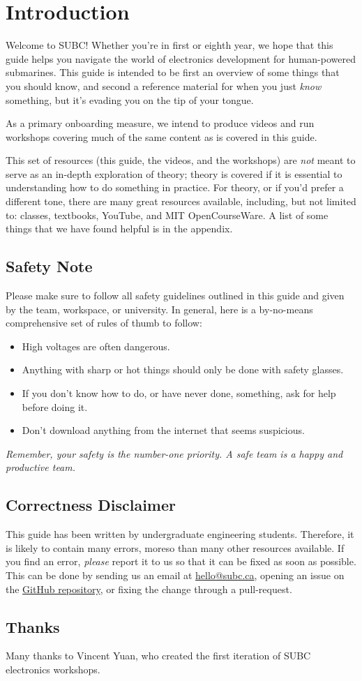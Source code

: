\chapter{Introduction}
Welcome to SUBC! Whether you're in first or eighth year, we hope that this guide helps you navigate the world of electronics development for human-powered submarines. This guide is intended to be first an overview of some things that you should know, and second a reference material for when you just \emph{know} something, but it's evading you on the tip of your tongue.

As a primary onboarding measure, we intend to produce videos and run workshops covering much of the same content as is covered in this guide.

This set of resources (this guide, the videos, and the workshops) are \emph{not} meant to serve as an in-depth exploration of theory; theory is covered if it is essential to understanding how to do something in practice. For theory, or if you'd prefer a different tone, there are many great resources available, including, but not limited to: classes, textbooks, YouTube, and MIT OpenCourseWare. A list of some things that we have found helpful is in the appendix.

\section{Safety Note}
Please make sure to follow all safety guidelines outlined in this guide and given by the team, workspace, or university. In general, here is a by-no-means comprehensive set of rules of thumb to follow:
\begin{itemize}
	\item High voltages are often dangerous.
	\item Anything with sharp or hot things should only be done with safety glasses.
	\item If you don't know how to do, or have never done, something, ask for help before doing it.
	\item Don't download anything from the internet that seems suspicious.
\end{itemize}
\emph{Remember, your safety is the number-one priority. A safe team is a happy and productive team.}

\section{Correctness Disclaimer}
This guide has been written by undergraduate engineering students. Therefore, it is likely to contain many errors, moreso than many other resources available. If you find an error, \emph{please} report it to us so that it can be fixed as soon as possible. This can be done by sending us an email at \href{mailto:hello@subc.ca}{hello@subc.ca}, opening an issue on the \href{https://github.com/UBC-SUBC/elec-embedded-fundamentals}{GitHub repository}, or fixing the change through a pull-request.

\section{Thanks}
Many thanks to Vincent Yuan, who created the first iteration of SUBC electronics workshops.
